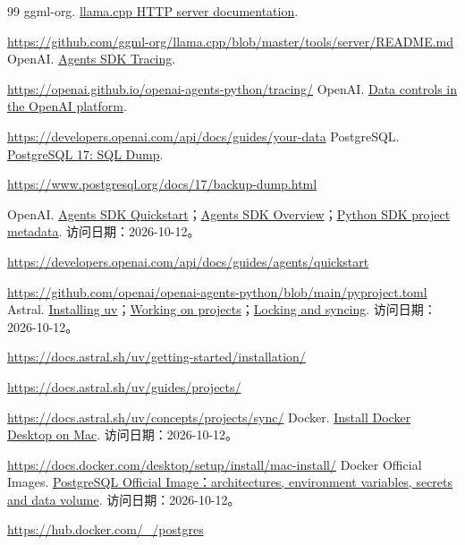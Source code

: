 \documentclass[11pt,a4paper]{article}
\begin{document}
\begin{thebibliography}{99}
 ggml-org. \href{https://github.com/ggml-org/llama.cpp/blob/master/tools/server/README.md}{llama.cpp HTTP server documentation}.\par\url{https://github.com/ggml-org/llama.cpp/blob/master/tools/server/README.md}
 OpenAI. \href{https://openai.github.io/openai-agents-python/tracing/}{Agents SDK Tracing}.\par\url{https://openai.github.io/openai-agents-python/tracing/}
 OpenAI. \href{https://developers.openai.com/api/docs/guides/your-data}{Data controls in the OpenAI platform}.\par\url{https://developers.openai.com/api/docs/guides/your-data}
 PostgreSQL. \href{https://www.postgresql.org/docs/17/backup-dump.html}{PostgreSQL 17: SQL Dump}.\par\url{https://www.postgresql.org/docs/17/backup-dump.html}

 OpenAI. \href{https://developers.openai.com/api/docs/guides/agents/quickstart}{Agents SDK Quickstart}；\href{https://developers.openai.com/api/docs/guides/agents/sdk}{Agents SDK Overview}；\href{https://github.com/openai/openai-agents-python/blob/main/pyproject.toml}{Python SDK project metadata}. 访问日期：2026-10-12。\par\url{https://developers.openai.com/api/docs/guides/agents/quickstart}\par\url{https://github.com/openai/openai-agents-python/blob/main/pyproject.toml}
 Astral. \href{https://docs.astral.sh/uv/getting-started/installation/}{Installing uv}；\href{https://docs.astral.sh/uv/guides/projects/}{Working on projects}；\href{https://docs.astral.sh/uv/concepts/projects/sync/}{Locking and syncing}. 访问日期：2026-10-12。\par\url{https://docs.astral.sh/uv/getting-started/installation/}\par\url{https://docs.astral.sh/uv/guides/projects/}\par\url{https://docs.astral.sh/uv/concepts/projects/sync/}
 Docker. \href{https://docs.docker.com/desktop/setup/install/mac-install/}{Install Docker Desktop on Mac}. 访问日期：2026-10-12。\par\url{https://docs.docker.com/desktop/setup/install/mac-install/}
 Docker Official Images. \href{https://hub.docker.com/_/postgres}{PostgreSQL Official Image：architectures, environment variables, secrets and data volume}. 访问日期：2026-10-12。\par\url{https://hub.docker.com/_/postgres}


\end{thebibliography}
\end{document}
